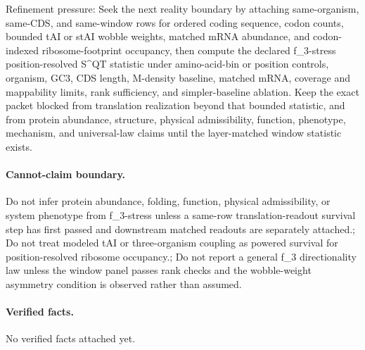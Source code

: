 Refinement pressure: Seek the next reality boundary by attaching same-organism, same-CDS, and same-window rows for ordered coding sequence, codon counts, bounded tAI or stAI wobble weights, matched mRNA abundance, and codon-indexed ribosome-footprint occupancy, then compute the declared f\_3-stress position-resolved S\textasciicircum{}QT statistic under amino-acid-bin or position controls, organism, GC3, CDS length, M-density baseline, matched mRNA, coverage and mappability limits, rank sufficiency, and simpler-baseline ablation. Keep the exact packet blocked from translation realization beyond that bounded statistic, and from protein abundance, structure, physical admissibility, function, phenotype, mechanism, and universal-law claims until the layer-matched window statistic exists.

\paragraph{Cannot-claim boundary.} Do not infer protein abundance, folding, function, physical admissibility, or system phenotype from f\_3-stress unless a same-row translation-readout survival step has first passed and downstream matched readouts are separately attached.; Do not treat modeled tAI or three-organism coupling as powered survival for position-resolved ribosome occupancy.; Do not report a general f\_3 directionality law unless the window panel passes rank checks and the wobble-weight asymmetry condition is observed rather than assumed.

\paragraph{Verified facts.}
No verified facts attached yet.
